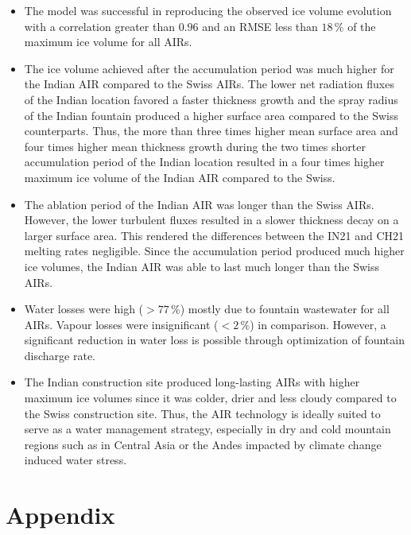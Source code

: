 \documentclass[utf8]{frontiersSCNS}
\begin{document}
\begin{itemize}
	\item The model was successful in reproducing the observed ice volume evolution with a correlation greater
	      than $0.96$ and an RMSE less than $18 \, \%$ of the maximum ice volume for all AIRs.

	\item The ice volume achieved after the accumulation period was much higher for the Indian AIR compared to the
	      Swiss AIRs. The lower net radiation fluxes of the Indian location favored a faster thickness growth and the
	      spray radius of the Indian fountain produced a higher surface area compared to the Swiss counterparts. Thus,
        the more than three times higher mean surface area and four times higher mean thickness growth
        during the two times shorter accumulation period of the Indian location resulted in a four times higher
        maximum ice volume of the Indian AIR compared to the Swiss.

	\item The ablation period of the Indian AIR was longer than the Swiss AIRs. However, the lower turbulent fluxes resulted in
	      a slower thickness decay on a larger surface area. This rendered the differences between the IN21 and CH21
	      melting rates negligible. Since the accumulation period produced much higher ice volumes, the Indian AIR was
	      able to last much longer than the Swiss AIRs.

  \item Water losses were high ($>77\,\%$) mostly due to fountain wastewater for all AIRs. Vapour losses
    were insignificant ($<2\,\%$) in comparison. However, a significant reduction in water loss is possible
    through optimization of fountain discharge rate.

  \item The Indian construction site produced long-lasting AIRs with higher maximum ice volumes since it was
    colder, drier and less cloudy compared to the Swiss construction site. Thus, the AIR technology is ideally
    suited to serve as a water management strategy, especially in dry and cold mountain regions such as in
    Central Asia or the Andes impacted by climate change induced water stress.

\end{itemize}

\section{Appendix}
\end{document}
